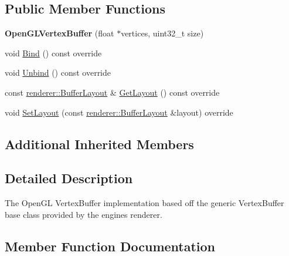 \subsection*{Public Member Functions}
\begin{DoxyCompactItemize}
\item 
\mbox{\label{classengine_1_1platform_1_1opengl_1_1OpenGLVertexBuffer_a481164805afb44795f3e545e07c3b3bc}} 
{\bfseries Open\+G\+L\+Vertex\+Buffer} (float $\ast$vertices, uint32\+\_\+t size)
\item 
void \hyperlink{classengine_1_1platform_1_1opengl_1_1OpenGLVertexBuffer_ac50918719a747f81d7fe94dfcc8dec13}{Bind} () const override
\item 
void \hyperlink{classengine_1_1platform_1_1opengl_1_1OpenGLVertexBuffer_a9069ca746c0de9dd9418ba9c5ee7b67b}{Unbind} () const override
\item 
const \hyperlink{classengine_1_1renderer_1_1BufferLayout}{renderer\+::\+Buffer\+Layout} \& \hyperlink{classengine_1_1platform_1_1opengl_1_1OpenGLVertexBuffer_a0d4f81503171f6bbe41ece0fada23390}{Get\+Layout} () const override
\item 
void \hyperlink{classengine_1_1platform_1_1opengl_1_1OpenGLVertexBuffer_a957a9dc55dc35ce4302654e1a394e5f8}{Set\+Layout} (const \hyperlink{classengine_1_1renderer_1_1BufferLayout}{renderer\+::\+Buffer\+Layout} \&layout) override
\end{DoxyCompactItemize}
\subsection*{Additional Inherited Members}


\subsection{Detailed Description}
The Open\+GL Vertex\+Buffer implementation based off the generic Vertex\+Buffer base class provided by the engines renderer. 

\subsection{Member Function Documentation}
\mbox{\label{classengine_1_1platform_1_1opengl_1_1OpenGLVertexBuffer_ac50918719a747f81d7fe94dfcc8dec13}} 
